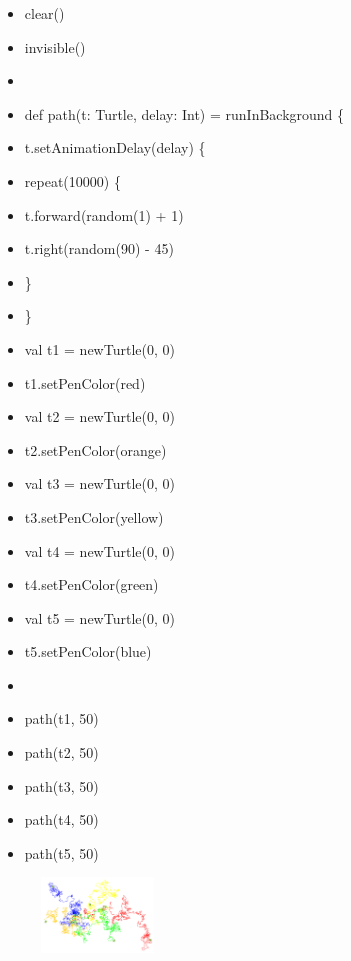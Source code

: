 \begin{scriptsize}
\begin{minipage}{0.70\textwidth}
\begin{itemize}[itemsep=-3pt,parsep=2pt, leftmargin=-0.0mm ]
\item[] clear()
\item[] invisible()
\item[] 
\item[] def path(t: Turtle, delay: Int) = runInBackground \{
\item[] \hspace{8pt} t.setAnimationDelay(delay) \{
\item[] \hspace{8pt} repeat(10000) \{
\item[] \hspace{8pt}\hspace{8pt} t.forward(random(1) + 1)
\item[] \hspace{8pt}\hspace{8pt} t.right(random(90) - 45)
\item[] \hspace{8pt} \}
\item[] \}
\item[] val t1 = newTurtle(0, 0)
\item[] t1.setPenColor(red)
\item[] val t2 = newTurtle(0, 0)
\item[] t2.setPenColor(orange)
\item[] val t3 = newTurtle(0, 0)
\item[] t3.setPenColor(yellow)
\item[] val t4 = newTurtle(0, 0)
\item[] t4.setPenColor(green)
\item[] val t5 = newTurtle(0, 0)
\item[] t5.setPenColor(blue)
\item[]
\item[] path(t1, 50)
\item[] path(t2, 50)
\item[] path(t3, 50)
\item[] path(t4, 50)
\item[] path(t5, 50)
\end{itemize}
\end{minipage}
\end{scriptsize}
\begin{minipage}{0.3\textwidth}
\begin{figure}[H]
\includegraphics[width=3.0cm,trim=4 4 8 4,clip]{./images/caos-della-vita/caos-della-vita-3.png}
\label{dec-2}
\end{figure}
\end{minipage} \hfill

